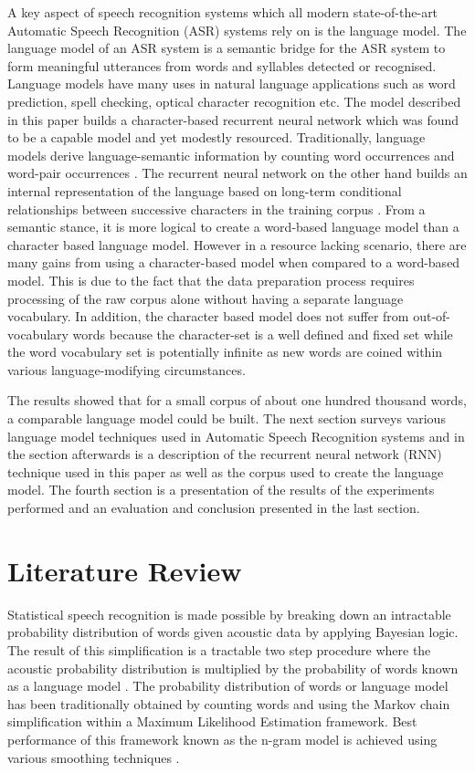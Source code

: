 \documentclass[a4paper]{article}
\begin{document}
A key aspect of speech recognition systems which all modern state-of-the-art Automatic Speech Recognition (ASR) systems rely on is the language model.  The language model of an ASR system is a semantic bridge for the ASR system to form meaningful utterances from words and syllables detected or recognised.  Language models have many uses in natural language applications such as word prediction, spell checking, optical character recognition etc.  The model described in this paper builds a character-based recurrent neural network which was found to be a capable model and yet modestly resourced.  Traditionally, language models derive language-semantic information by counting word occurrences and word-pair occurrences \cite{allen1995natural,jelinek1976continuous}. The recurrent neural network on the other hand builds an internal representation of the language based on long-term conditional relationships between successive characters in the training corpus \cite{mikolov2011empirical}.   From a semantic stance, it is more logical to create a word-based language model than a character based language model.  However in a resource lacking scenario, there are many gains from using a character-based model when compared to a word-based model.  This is due to the fact that the data preparation process requires processing of the raw corpus alone without having a separate language vocabulary.  In addition, the character based model does not suffer from out-of-vocabulary words because the character-set is a well defined and fixed set while the word vocabulary set is potentially infinite as new words are coined within various language-modifying circumstances.

The results showed that for a small corpus of about one hundred thousand words, a comparable language model could be built. The next section surveys various language model techniques used in Automatic Speech Recognition systems and in the section afterwards is a description of the recurrent neural network (RNN) technique used in this paper as well as the corpus used to create the language model.  The fourth section is a presentation of the results of the experiments performed and an evaluation and conclusion presented in the last section.


\section{Literature Review}

Statistical speech recognition is made possible by breaking down an intractable probability distribution of words given acoustic data by applying Bayesian logic. The result of this simplification is a tractable two step procedure where the acoustic probability distribution is multiplied by the probability of words known as a language model \cite{gales2007}.  The probability distribution of words or language model has been traditionally obtained by counting words and using the Markov chain simplification within a Maximum Likelihood Estimation framework.  Best performance of this framework known as the n-gram model is achieved using various smoothing techniques \cite{chen1996empirical}.
\end{document}
